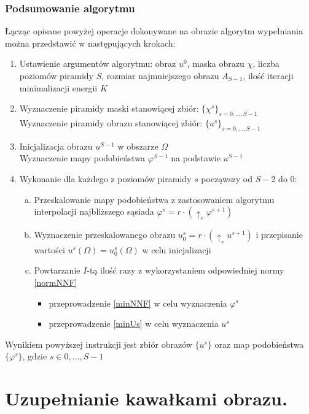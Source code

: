 \documentclass[12pt, twoside, openany]{report}
\theoremstyle{definition}
\begin{document}
\subsection{Podsumowanie algorytmu}
Łącząc opisane powyżej operacje dokonywane na obrazie algorytm wypełniania można przedstawić w następujących krokach:
\begin{enumerate}
\item
Ustawienie argumentów algorytmu: obraz $u^{0}$, maska obrazu $\chi$, liczba poziomów piramidy $S$, rozmiar najmniejszego obrazu $A_{S-1}$, ilość iteracji minimalizacji energii $K$
\item
Wyznaczenie piramidy maski stanowiącej zbiór: $\{\chi^s\}_{s=0,...,S-1}$ \\
Wyznaczenie piramidy obrazu stanowiącej zbiór: $\{u^s\}_{s=0,...,S-1}$
\item
Inicjalizacja obrazu $u^{S-1}$ w obszarze $\Omega$ \\
Wyznaczenie mapy podobieństwa $\varphi^{S-1}$ na podstawie $u^{S-1}$
\item
Wykonanie dla każdego z poziomów piramidy $s$ począwszy od $S-2$ do $0$:
\begin{enumerate}[a)]
\item
Przeskalowanie mapy podobieństwa z zastosowaniem algorytmu interpolacji najbliższego sąsiada $\varphi^s=r \cdot (\uparrow_r \varphi^{s+1})$
\item
Wyznaczenie przeskalowanego obrazu $u^s_0=r \cdot (\uparrow_r u^{s+1})$ i przepisanie wartości $u^s(\Omega)=u^s_0(\Omega)$ w celu inicjalizacji
\item
Powtarzanie $I$-tą ilość razy z wykorzystaniem odpowiedniej normy \eqref{normNNF}
\begin{itemize}
\item
przeprowadzenie \eqref{minNNF} w celu wyznaczenia $\varphi^s$
\item
przeprowadzenie \eqref{minUs} w celu wyznaczenia $u^s$
\end{itemize}  
\end{enumerate}
\end{enumerate}
Wynikiem powyższej instrukcji jest zbiór obrazów $\{u^s\}$ oraz map podobieństwa $\{\varphi^s\}$, gdzie $s \in {0,...,S-1}$
\chapter{Uzupełnianie kawałkami obrazu.}
\end{document}
